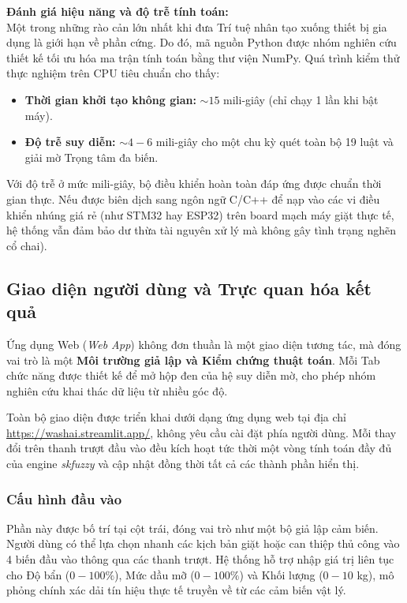 \documentclass[12pt, a4paper]{article}
\begin{document}
\textbf{Đánh giá hiệu năng và độ trễ tính toán:}\\
Một trong những rào cản lớn nhất khi đưa Trí tuệ nhân tạo xuống thiết bị gia dụng là giới hạn về phần cứng. Do đó, mã nguồn Python được nhóm nghiên cứu thiết kế tối ưu hóa ma trận tính toán bằng thư viện NumPy. Quá trình kiểm thử thực nghiệm trên CPU tiêu chuẩn cho thấy:
\begin{itemize}
    \item \textbf{Thời gian khởi tạo không gian:} $\sim 15$ mili-giây (chỉ chạy 1 lần khi bật máy).
    \item \textbf{Độ trễ suy diễn:} $\sim 4-6$ mili-giây cho một chu kỳ quét toàn bộ 19 luật và giải mờ Trọng tâm đa biến.
\end{itemize}
Với độ trễ ở mức mili-giây, bộ điều khiển hoàn toàn đáp ứng được chuẩn thời gian thực. Nếu được biên dịch sang ngôn ngữ C/C++ để nạp vào các vi điều khiển nhúng giá rẻ (như STM32 hay ESP32) trên board mạch máy giặt thực tế, hệ thống vẫn đảm bảo dư thừa tài nguyên xử lý mà không gây tình trạng nghẽn cổ chai).

\subsection{Giao diện người dùng và Trực quan hóa kết quả}
Ứng dụng Web (\textit{Web App}) không đơn thuần là một giao diện tương tác, mà đóng vai trò là một \textbf{Môi trường giả lập và Kiểm chứng thuật toán}. Mỗi Tab chức năng được thiết kế để mở hộp đen của hệ suy diễn mờ, cho phép nhóm nghiên cứu khai thác dữ liệu từ nhiều góc độ.

Toàn bộ giao diện được triển khai dưới dạng ứng dụng web tại địa chỉ \url{https://washai.streamlit.app/}, không yêu cầu cài đặt phía người dùng. Mỗi thay đổi trên thanh trượt đầu vào đều kích hoạt tức thời một vòng tính toán đầy đủ của engine \textit{skfuzzy} và cập nhật đồng thời tất cả các thành phần hiển thị.

\subsubsection{Cấu hình đầu vào}
Phần này được bố trí tại cột trái, đóng vai trò như một bộ giả lập cảm biến. Người dùng có thể lựa chọn nhanh các kịch bản giặt hoặc can thiệp thủ công vào 4 biến đầu vào thông qua các thanh trượt. Hệ thống hỗ trợ nhập giá trị liên tục cho Độ bẩn ($0-100\%$), Mức dầu mỡ ($0-100\%$) và Khối lượng ($0-10$ kg), mô phỏng chính xác dải tín hiệu thực tế truyền về từ các cảm biến vật lý.
\end{document}
